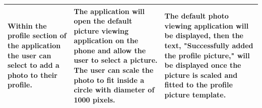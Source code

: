 \documentclass[a4paper, titlepage]{article}
\begin{document}
\begin{tabularx}{\linewidth}{ |*{3}{X|}}
	\hline\hline
	Within the profile section of the application the user can select to add a photo to their profile. & The application will open the default picture viewing application on the phone and allow the user to select a picture. The user can scale the photo to fit inside a circle with diameter of 1000 pixels. & The default photo viewing application will be displayed, then the text, "Successfully added the profile picture," will be displayed once the picture is scaled and fitted to the profile picture template.\\
\hline
\end{tabularx}
\end{document}

